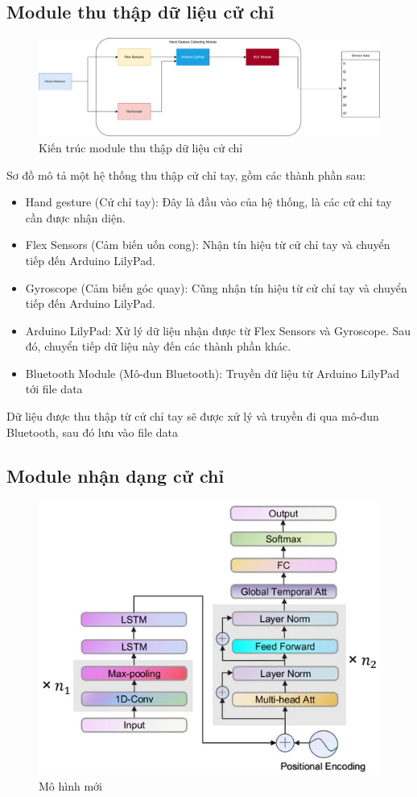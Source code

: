 \subsection{Module thu thập dữ liệu cử chỉ}
\begin{figure}[H]
    \centering
    \includegraphics[width=\textwidth,height=\textheight,keepaspectratio]{Images/Architecture/Gesture Collecting Module.png}
    \caption{Kiến trúc module thu thập dữ liệu cử chỉ}
    \label{fig:enter-label}
\end{figure}

Sơ đồ mô tả một hệ thống thu thập cử chỉ tay, gồm các thành phần sau:
\begin{itemize}
\item Hand gesture (Cử chỉ tay): Đây là đầu vào của hệ thống, là các cử chỉ tay cần được nhận diện.
\item Flex Sensors (Cảm biến uốn cong): Nhận tín hiệu từ cử chỉ tay và chuyển tiếp đến Arduino LilyPad.
\item Gyroscope (Cảm biến góc quay): Cũng nhận tín hiệu từ cử chỉ tay và chuyển tiếp đến Arduino LilyPad.
\item Arduino LilyPad: Xử lý dữ liệu nhận được từ Flex Sensors và Gyroscope. Sau đó, chuyển tiếp dữ liệu này đến các thành phần khác.
\item Bluetooth Module (Mô-đun Bluetooth): Truyền dữ liệu từ Arduino LilyPad tới file data
\end{itemize}


Dữ liệu được thu thập từ cử chỉ tay sẽ được xử lý và truyền đi qua mô-đun Bluetooth, sau đó lưu vào file data
\subsection{Module nhận dạng cử chỉ}
\begin{figure}[H]
   \centering
   \includegraphics[width=0.8\linewidth]{Images/Architecture/SADeepConv.png}
   \caption{Mô hình mới}
   \label{fig:new-model}
\end{figure}


